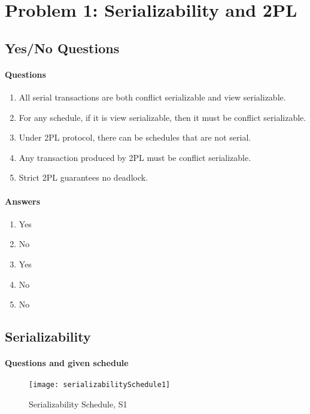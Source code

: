 \section{Problem 1: Serializability and 2PL}
\subsection{Yes/No Questions}
\paragraph{Questions}
\begin{enumerate}
	\item  All serial transactions are both conflict serializable and view serializable.
	\item For any schedule, if it is view serializable, then it must be conﬂict serializable.
	\item  Under 2PL protocol, there can be schedules that are not serial.
	\item  Any transaction produced by 2PL must be conﬂict serializable.
	\item  Strict 2PL guarantees no deadlock.
\end{enumerate}

\paragraph{Answers}
\begin{enumerate}
	\item Yes
	\item No
	\item Yes
	\item No
	\item No
\end{enumerate}

\subsection{Serializability}
\paragraph{Questions and given schedule}


\begin{figure}[H]
	\texttt{[image: serializabilitySchedule1]}
	\caption{Serializability Schedule, S1}
	\label{Serializability Schedule}
\end{figure}

